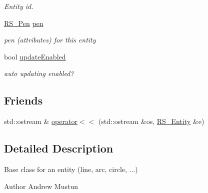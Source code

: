 \begin{DoxyCompactItemize}
\begin{DoxyCompactList}\small\item\em Entity id. \end{DoxyCompactList}\item 
\hypertarget{classRS__Entity_a9651a97a17dda8a5d2706e50fcf8c6f7}{\hyperlink{classRS__Pen}{R\-S\-\_\-\-Pen} \hyperlink{classRS__Entity_a9651a97a17dda8a5d2706e50fcf8c6f7}{pen}}\label{classRS__Entity_a9651a97a17dda8a5d2706e50fcf8c6f7}

\begin{DoxyCompactList}\small\item\em pen (attributes) for this entity \end{DoxyCompactList}\item 
\hypertarget{classRS__Entity_a3136a9226397901cd8d642a9678ceff0}{bool \hyperlink{classRS__Entity_a3136a9226397901cd8d642a9678ceff0}{update\-Enabled}}\label{classRS__Entity_a3136a9226397901cd8d642a9678ceff0}

\begin{DoxyCompactList}\small\item\em auto updating enabled? \end{DoxyCompactList}\end{DoxyCompactItemize}
\subsection*{Friends}
\begin{DoxyCompactItemize}
\item 
std\-::ostream \& \hyperlink{classRS__Entity_a4a038b2f4f4ac94808204fc42a6d0f33}{operator$<$$<$} (std\-::ostream \&os, \hyperlink{classRS__Entity}{R\-S\-\_\-\-Entity} \&e)
\end{DoxyCompactItemize}


\subsection{Detailed Description}
Base class for an entity (line, arc, circle, ...)

\begin{DoxyAuthor}{Author}
Andrew Mustun 
\end{DoxyAuthor}


